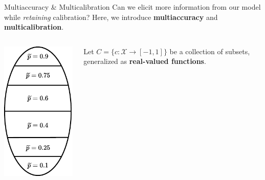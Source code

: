 \documentclass{beamer}
\begin{document}
\begin{frame}{Multiaccuracy \& Multicalibration}
	Can we elicit more information from our model while \textit{retaining} calibration? \pause Here, we introduce \textbf{multiaccuracy} and \textbf{multicalibration}. \pause
	\begin{columns}
		\begin{column}{0.3\textwidth}
			\begin{center}
				\includegraphics[width=.8\textwidth]{img/partitions}
			\end{center}
		\end{column}
		\begin{column}{0.7\textwidth}

			Let $C = \{c: \mathcal{X} \rightarrow [-1, 1]\}$ be a collection of subsets, generalized as \textbf{real-valued functions}. \pause \newline \\


\end{column}
\end{columns}
\end{frame}
\end{document}
